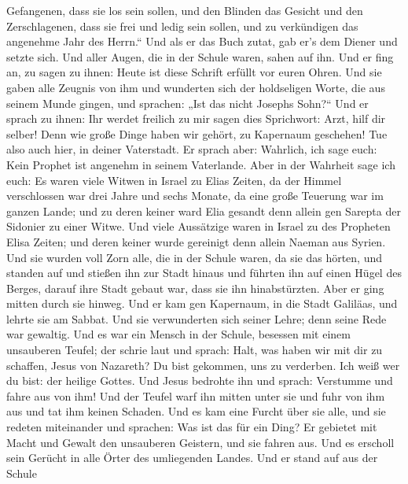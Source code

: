 Gefangenen, dass sie los sein sollen, und den Blinden das Gesicht und
den Zerschlagenen, dass sie frei und ledig sein sollen, 
und zu verkündigen das angenehme Jahr des Herrn.``  Und als
er das Buch zutat, gab er's dem Diener und setzte sich. Und aller Augen,
die in der Schule waren, sahen auf ihn.  Und er fing an, zu
sagen zu ihnen: Heute ist diese Schrift erfüllt vor euren Ohren.
 Und sie gaben alle Zeugnis von ihm und wunderten sich der
holdseligen Worte, die aus seinem Munde gingen, und sprachen: „Ist das
nicht Josephs Sohn?{}``  Und er sprach zu ihnen: Ihr werdet
freilich zu mir sagen dies Sprichwort: Arzt, hilf dir selber! Denn wie
große Dinge haben wir gehört, zu Kapernaum geschehen! Tue also auch
hier, in deiner Vaterstadt.  Er sprach aber: Wahrlich, ich
sage euch: Kein Prophet ist angenehm in seinem Vaterlande. 
Aber in der Wahrheit sage ich euch: Es waren viele Witwen in Israel zu
Elias Zeiten, da der Himmel verschlossen war drei Jahre und sechs
Monate, da eine große Teuerung war im ganzen Lande;  und zu
deren keiner ward Elia gesandt denn allein gen Sarepta der Sidonier zu
einer Witwe.  Und viele Aussätzige waren in Israel zu des
Propheten Elisa Zeiten; und deren keiner wurde gereinigt denn allein
Naeman aus Syrien.  Und sie wurden voll Zorn alle, die in
der Schule waren, da sie das hörten,  und standen auf und
stießen ihn zur Stadt hinaus und führten ihn auf einen Hügel des Berges,
darauf ihre Stadt gebaut war, dass sie ihn hinabstürzten. 
Aber er ging mitten durch sie hinweg.  Und er kam gen
Kapernaum, in die Stadt Galiläas, und lehrte sie am Sabbat.
 Und sie verwunderten sich seiner Lehre; denn seine Rede
war gewaltig.  Und es war ein Mensch in der Schule,
besessen mit einem unsauberen Teufel; der schrie laut  und
sprach: Halt, was haben wir mit dir zu schaffen, Jesus von Nazareth? Du
bist gekommen, uns zu verderben. Ich weiß wer du bist: der heilige
Gottes.  Und Jesus bedrohte ihn und sprach: Verstumme und
fahre aus von ihm! Und der Teufel warf ihn mitten unter sie und fuhr von
ihm aus und tat ihm keinen Schaden.  Und es kam eine Furcht
über sie alle, und sie redeten miteinander und sprachen: Was ist das für
ein Ding? Er gebietet mit Macht und Gewalt den unsauberen Geistern, und
sie fahren aus.  Und es erscholl sein Gerücht in alle Örter
des umliegenden Landes.  Und er stand auf aus der Schule

